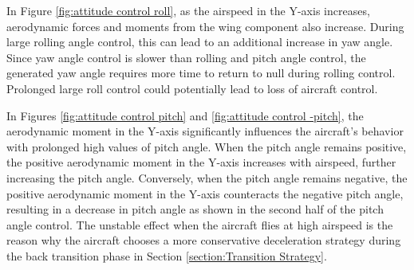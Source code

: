 In Figure \ref{fig:attitude control roll}, as the airspeed in the Y-axis increases, aerodynamic forces and moments from the wing component also increase. During large rolling angle control, this can lead to an additional increase in yaw angle. Since yaw angle control is slower than rolling and pitch angle control, the generated yaw angle requires more time to return to null during rolling control. Prolonged large roll control could potentially lead to loss of aircraft control.

In Figures \ref{fig:attitude control pitch} and \ref{fig:attitude control -pitch}, the aerodynamic moment in the Y-axis significantly influences the aircraft's behavior with prolonged high values of pitch angle. When the pitch angle remains positive, the positive aerodynamic moment in the Y-axis increases with airspeed, further increasing the pitch angle. Conversely, when the pitch angle remains negative, the positive aerodynamic moment in the Y-axis counteracts the negative pitch angle, resulting in a decrease in pitch angle as shown in the second half of the pitch angle control. The unstable effect when the aircraft flies at high airspeed is the reason why the aircraft chooses a more conservative deceleration strategy during the back transition phase in Section \ref{section:Transition Strategy}.


